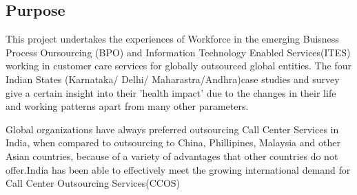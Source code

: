 \subsection{Purpose}

This project undertakes the experiences of Workforce in the emerging Buisness Process Oursourcing (BPO) and Information Technology Enabled Services(ITES) working in customer care services for globally outsourced global entities. The four Indian States (Karnataka/ Delhi/ Maharastra/Andhra)case studies and survey give a certain insight into their 'health impact' due to the changes in their life and working patterns apart from many other parameters.

Global organizations have always preferred outsourcing Call Center Services in India, when compared to outsourcing to China, Phillipines, Malaysia and other Asian countries, because of a variety of advantages that other countries do not offer.India has been able to effectively meet the growing international demand for Call Center Outsourcing Services(CCOS)  
    
    